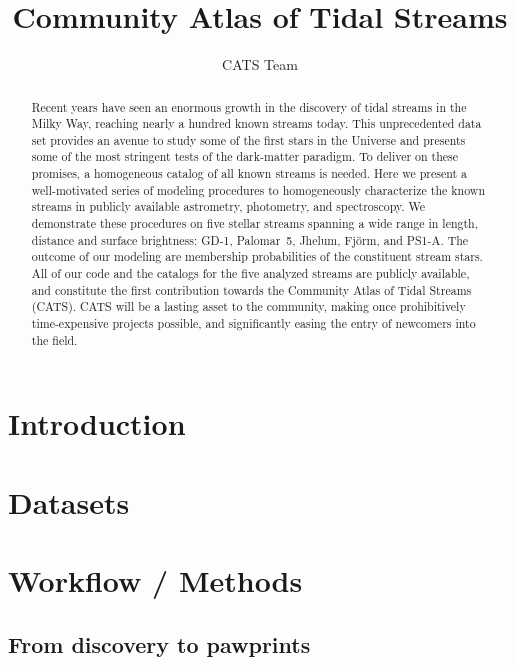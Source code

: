 \documentclass[twocolumn]{aastex63}
\begin{document}
\sloppy\sloppypar\raggedbottom\frenchspacing %

\title{Community Atlas of Tidal Streams}


\author{CATS Team}



\begin{abstract}\noindent %
Recent years have seen an enormous growth in the discovery of tidal streams in the Milky Way, reaching nearly a hundred known streams today.
This unprecedented data set provides an avenue to study some of the first stars in the Universe and presents some of the most stringent tests of the dark-matter paradigm.
To deliver on these promises, a homogeneous catalog of all known streams is needed.
Here we present a well-motivated series of modeling procedures to homogeneously characterize the known streams in publicly available astrometry, photometry, and spectroscopy.
We demonstrate these procedures on five stellar streams spanning a wide range in length, distance and surface brightness: GD-1, Palomar~5, Jhelum, Fj\" orm, and PS1-A.
The outcome of our modeling are membership probabilities of the constituent stream stars.
All of our code and the catalogs for the five analyzed streams are publicly available, and constitute the first contribution towards the Community Atlas of Tidal Streams (CATS).
CATS will be a lasting asset to the community, making once prohibitively time-expensive projects possible, and significantly easing the entry of newcomers into the field.
\end{abstract}

\section{Introduction}

\section{Datasets}

\section{Workflow / Methods}

\subsection{From discovery to pawprints}
\end{document}
